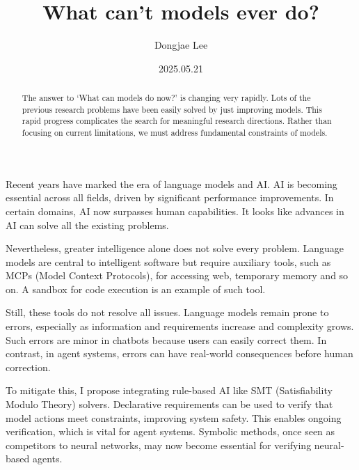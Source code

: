 \documentclass[11pt, oneside]{article}
\title{What can't models ever do?}
\author{Dongjae Lee}
\date{2025.05.21}
\begin{document}
\maketitle

\begin{abstract}
	The answer to `What can models do now?' is changing very rapidly.
	Lots of the previous research problems have been easily solved by just improving models.
	This rapid progress complicates the search for meaningful research directions.
	Rather than focusing on current limitations, we must address fundamental constraints of models.
\end{abstract}

Recent years have marked the era of language models and AI.
AI is becoming essential across all fields, driven by significant performance improvements.
In certain domains, AI now surpasses human capabilities.
It looks like advances in AI can solve all the existing problems.

Nevertheless, greater intelligence alone does not solve every problem.
Language models are central to intelligent software but require auxiliary tools, such as MCPs (Model Context Protocols), for accessing web, temporary memory and so on.
A sandbox for code execution is an example of such tool.

Still, these tools do not resolve all issues.
Language models remain prone to errors, especially as information and requirements increase and complexity grows.
Such errors are minor in chatbots because users can easily correct them.
In contrast, in agent systems, errors can have real-world consequences before human correction.

To mitigate this, I propose integrating rule-based AI like SMT (Satisfiability Modulo Theory) solvers.
Declarative requirements can be used to verify that model actions meet constraints, improving system safety.
This enables ongoing verification, which is vital for agent systems.
Symbolic methods, once seen as competitors to neural networks, may now become essential for verifying neural-based agents.
\end{document}
